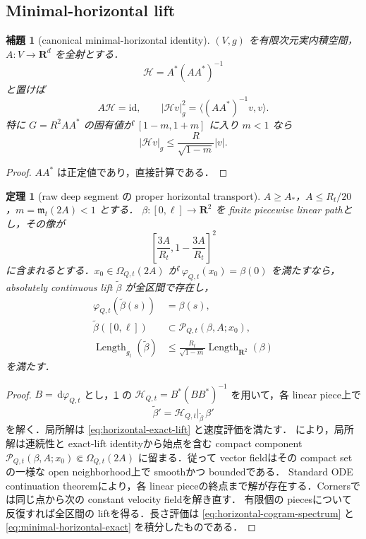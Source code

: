 \documentclass[a4paper,11pt]{ltjsarticle}
\numberwithin{equation}{section}
\theoremstyle{plain}
\newtheorem{theorem}{定理}[section]
\newtheorem{lemma}[lemma]{補題}
\theoremstyle{definition}
\theoremstyle{remark}
\newcommand{\RR}{\mathbf R}
\newcommand{\cP}{\mathcal P}
\newcommand{\dd}{\,\mathrm d}
\newcommand{\Length}{\operatorname{Length}}
\newcommand{\id}{\mathrm{id}}
\begin{document}
\subsection{Minimal-horizontal lift}

\begin{lemma}[canonical minimal-horizontal identity]\label{lem:minimal-horizontal-identity}
$(V,g)$ を有限次元実内積空間，$A:V\to\RR^d$ を全射とする．
\[
 \mathcal H=A^*(AA^*)^{-1}
\]
と置けば
\begin{equation}\label{eq:minimal-horizontal-exact}
 A\mathcal H=\id,\qquad
 |\mathcal H v|_g^2=\langle(AA^*)^{-1}v,v\rangle.
\end{equation}
特に $G=R^2AA^*$ の固有値が $[1-m,1+m]$ に入り $m<1$ なら
\[
 |\mathcal H v|_g\le \frac{R}{\sqrt{1-m}}|v|.
\]
\end{lemma}

\begin{proof}
$AA^*$ は正定値であり，直接計算である．
\end{proof}

\begin{theorem}[raw deep segment の proper horizontal transport]\label{thm:proper-horizontal-transport}
$A\ge A_*$，$A\le R_t/20$，$m=\mathfrak m_t(2A)<1$ とする．
$\beta:[0,\ell]\to\RR^2$ を finite piecewise linear pathとし，その像が
\[
 \left[\frac{3A}{R_t},1-\frac{3A}{R_t}\right]^2
\]
に含まれるとする．$x_0\in\Omega_{Q,t}(2A)$ が $\varphi_{Q,t}(x_0)=\beta(0)$ を満たすなら，
absolutely continuous lift $\widetilde\beta$ が全区間で存在し，
\begin{align}
 \varphi_{Q,t}(\widetilde\beta(s))&=\beta(s),\label{eq:horizontal-exact-lift}\\
 \widetilde\beta([0,\ell])&\subset \cP_{Q,t}(\beta,A;x_0),\label{eq:horizontal-trapping}\\
 \Length_{g_t}(\widetilde\beta)
 &\le \frac{R_t}{\sqrt{1-m}}\Length_{\RR^2}(\beta)
 \label{eq:horizontal-lift-length}
\end{align}
を満たす．
\end{theorem}

\begin{proof}
$B=\dd\varphi_{Q,t}$ とし，\cref{lem:minimal-horizontal-identity} の
$\mathcal H_{Q,t}=B^*(BB^*)^{-1}$ を用いて，各 linear piece上で
\[
 \widetilde\beta'=\mathcal H_{Q,t}|_{\widetilde\beta}\,\beta'
\]
を解く．局所解は \eqref{eq:horizontal-exact-lift} と速度評価を満たす．
 により，局所解は連続性と exact-lift identityから始点を含む compact component
$\cP_{Q,t}(\beta,A;x_0)\Subset\Omega_{Q,t}(2A)$ に留まる．従って vector fieldはその compact setの一様な open neighborhood上で smoothかつ boundedである．
Standard ODE continuation theoremにより，各 linear pieceの終点まで解が存在する．Cornersでは同じ点から次の constant velocity fieldを解き直す．
有限個の piecesについて反復すれば全区間の liftを得る．長さ評価は
\cref{eq:horizontal-cogram-spectrum} と \cref{eq:minimal-horizontal-exact} を積分したものである．
\end{proof}
\end{document}

